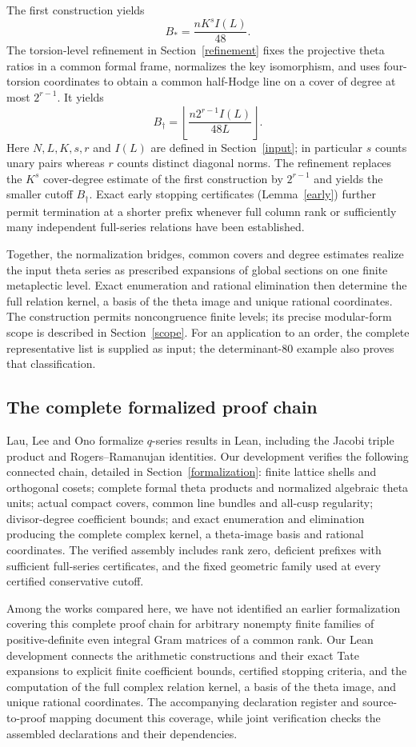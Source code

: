 \documentclass[11pt]{article}
\theoremstyle{remark}\newtheorem{remark}[theorem]{Remark}
\begin{document}
The first construction yields
\[
 B_* = \frac{nK^sI(L)}{48}.
\]
The torsion-level refinement in Section~\ref{refinement} fixes the projective
theta ratios in a common formal frame, normalizes the key isomorphism, and
uses four-torsion coordinates to obtain a common half-Hodge line on a cover
of degree at most $2^{r-1}$. It yields
\[
 B_\dagger=\left\lfloor\frac{n2^{r-1}I(L)}{48L}\right\rfloor.
\]
Here $N,L,K,s,r$ and $I(L)$ are defined in Section~\ref{input}; in particular
$s$ counts unary pairs whereas $r$ counts distinct diagonal norms.
The refinement replaces the $K^s$ cover-degree estimate of the first
construction by $2^{r-1}$ and yields the smaller cutoff $B_\dagger$.
Exact early stopping certificates (Lemma~\ref{early}) further permit
termination at a shorter prefix whenever full column rank or sufficiently
many independent full-series relations have been established.

Together, the normalization bridges, common covers and degree estimates
realize the input theta series as prescribed expansions of global sections
on one finite metaplectic level. Exact enumeration and rational elimination
then determine the full relation kernel, a basis of the theta image and
unique rational coordinates. The construction permits noncongruence finite
levels; its precise modular-form scope is described in Section~\ref{scope}.
For an application to an order, the complete representative list is supplied
as input; the determinant-$80$ example also proves that classification.

\subsection{The complete formalized proof chain}
Lau, Lee and Ono \cite{lau-lee-ono} formalize $q$-series results in Lean,
including the Jacobi triple product and Rogers--Ramanujan identities.
Our development verifies the following connected chain, detailed in
Section~\ref{formalization}: finite lattice shells and orthogonal cosets;
complete formal theta products and normalized algebraic theta units;
actual compact covers, common line bundles and all-cusp regularity;
divisor-degree coefficient bounds; and exact enumeration and elimination
producing the complete complex kernel, a theta-image basis and rational
coordinates. The verified assembly includes rank zero, deficient prefixes
with sufficient full-series certificates, and the fixed geometric family
used at every certified conservative cutoff.

Among the works compared here, we have not identified an earlier
formalization covering this complete proof chain for arbitrary nonempty
finite families of positive-definite even integral Gram matrices of a
common rank. Our Lean development connects the arithmetic constructions
and their exact Tate expansions to explicit finite coefficient bounds,
certified stopping criteria, and the computation of the full complex
relation kernel, a basis of the theta image, and unique rational coordinates.
The accompanying declaration register and source-to-proof mapping document
this coverage, while joint verification checks the assembled declarations
and their dependencies.
\end{document}
